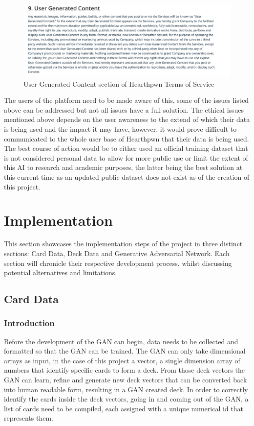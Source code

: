 \documentclass{report} %
\begin{document}
\begin{figure}[h]
\centering
\includegraphics[width=1\textwidth]{ToS}
\caption{User Generated Content section of Hearthpwn Terms of Service\protect\footnotemark}
 \label{board}
\end{figure}

The users of the platform need to be made aware of this, some of the issues listed above can be addressed but not all issues have a full solution. The ethical issues mentioned above depends on the user awareness to the extend of which their data is being used and the impact it may have, however, it would prove difficult to communicated to the whole user base of Hearthpwn that their data is being used. The best course of action would be to either used an official training dataset that is not considered personal data to allow for more public use or limit the extent of this AI to research and academic purposes, the latter being the best solution at this current time as an updated public dataset does not exist as of the creation of this project. 

\chapter{Implementation}
This section showcases the implementation steps of the project in three distinct sections: Card Data, Deck Data and Generative Adversarial Network. Each section will chronicle their respective development process, whilst discussing potential alternatives and limitations.
\section{Card Data}
\subsection{Introduction}
Before the development of the GAN can begin, data needs to be collected and formatted so that the GAN can be trained. The GAN can only take dimensional arrays as input, in the case of this project a vector, a single dimension array of numbers that identify specific cards to form a deck. From those deck vectors the GAN can learn, refine and generate new deck vectors that can be converted back into human readable form, resulting in a GAN created deck. In order to correctly identify the cards inside the deck vectors, going in and coming out of the GAN, a list of cards need to be compiled, each assigned with a unique numerical id that represents them.  
\end{document}

